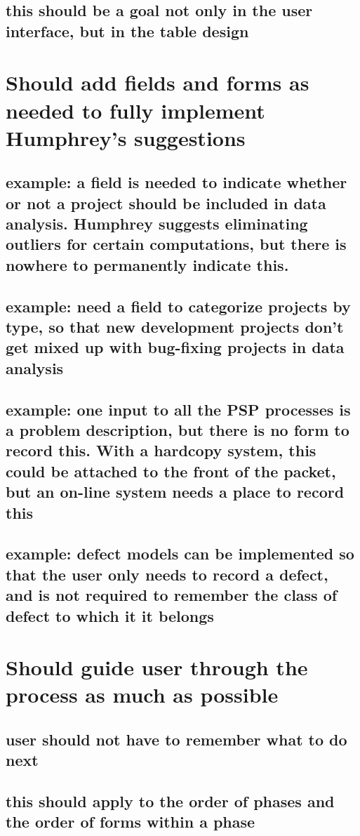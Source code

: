 \subsection{this should be a goal not only in the user interface, but in
the table design}
\section{Should add fields and forms as needed to fully implement
Humphrey's suggestions}
\subsection{example: a field is needed to indicate whether or not a project
should be included in data analysis.  Humphrey suggests eliminating
outliers for certain computations, but there is nowhere to permanently
indicate this.}
\subsection{example: need a field to categorize projects by type, so that
new development projects don't get mixed up with bug-fixing projects in data analysis}
\subsection{example: one input to all the PSP processes is a problem description, but
there is no form to record this.  With a hardcopy system, this could be
attached to the front of the packet, but an on-line system needs a place to
record this}
\subsection{example: defect models can be implemented so that the user only
needs to record a defect, and is not required to remember the class of
defect to which it it belongs}
\section{Should guide user through the process as much as possible}
\subsection{user should not have to remember what to do next}
\subsection{this should apply to the order of phases and the order of forms
within a phase}
